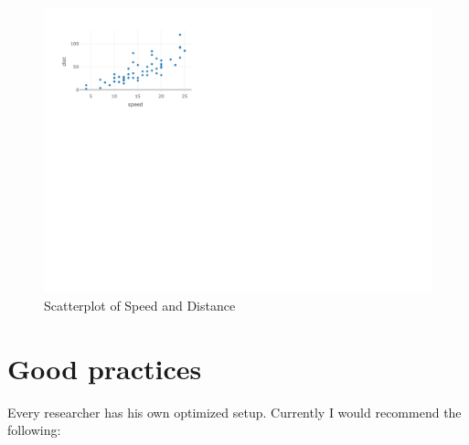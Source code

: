 \documentclass[12pt,]{article}
\theoremstyle{definition}
\theoremstyle{definition}
\theoremstyle{definition}
\theoremstyle{remark}
\begin{document}
\begin{figure}[H]

{\centering \includegraphics{paper_files/figure-latex/fig-3-1} 

}

\caption{Scatterplot of Speed and Distance}\label{fig:fig-3}
\end{figure}

\section{Good practices}\label{good-practices}

Every researcher has his own optimized setup. Currently I would
recommend the following:
\end{document}
